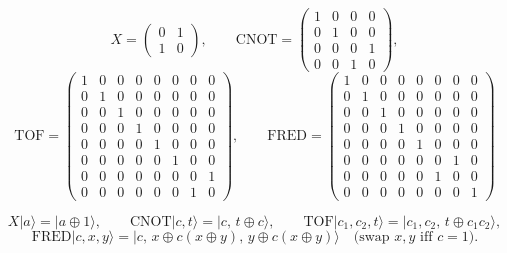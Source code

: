 \documentclass[11pt]{article}
\renewcommand{\ket}[1]{\lvert #1 \rangle}
\newcommand{\TOF}{\mathrm{TOF}}
\newcommand{\CNOT}{\mathrm{CNOT}}
\theoremstyle{plain}
\theoremstyle{remark}
\begin{document}
\begin{equation*}
X=\begin{pmatrix}0&1\\1&0\end{pmatrix},
\qquad
\CNOT=\begin{pmatrix}1&0&0&0\\0&1&0&0\\0&0&0&1\\0&0&1&0\end{pmatrix},
\end{equation*}
\begin{equation*}
\TOF=\left(\begin{smallmatrix}
1&0&0&0&0&0&0&0\\ 0&1&0&0&0&0&0&0\\ 0&0&1&0&0&0&0&0\\ 0&0&0&1&0&0&0&0\\
0&0&0&0&1&0&0&0\\ 0&0&0&0&0&1&0&0\\ 0&0&0&0&0&0&0&1\\ 0&0&0&0&0&0&1&0
\end{smallmatrix}\right),
\qquad
\mathrm{FRED}=\left(\begin{smallmatrix}
1&0&0&0&0&0&0&0\\ 0&1&0&0&0&0&0&0\\ 0&0&1&0&0&0&0&0\\ 0&0&0&1&0&0&0&0\\
0&0&0&0&1&0&0&0\\ 0&0&0&0&0&0&1&0\\ 0&0&0&0&0&1&0&0\\ 0&0&0&0&0&0&0&1
\end{smallmatrix}\right)
\end{equation*}

\[
X\ket a=\ket{a\oplus1},\qquad
\CNOT\ket{c,t}=\ket{c,\,t\oplus c},\qquad
\TOF\ket{c_1,c_2,t}=\ket{c_1,c_2,\,t\oplus c_1c_2},
\]
\[
\mathrm{FRED}\ket{c,x,y}=\ket{c,\,x\oplus c(x\oplus y),\,y\oplus c(x\oplus y)}
\quad\text{(swap $x,y$ iff $c=1$).}
\]
\end{document}
